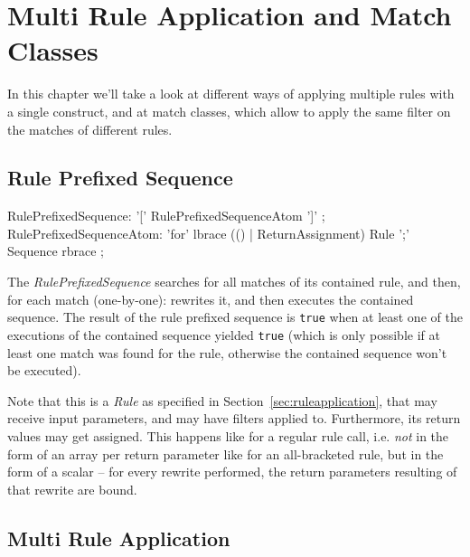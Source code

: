 \chapter{Multi Rule Application and Match Classes}
\label{cha:multiruleseq}

In this chapter we'll take a look at different ways of applying multiple rules with a single construct, and at match classes, which allow to apply the same filter on the matches of different rules.

\section{Rule Prefixed Sequence}\label{sec:ruleprefixedsequence}

\begin{rail}
  RulePrefixedSequence: '[' RulePrefixedSequenceAtom ']' ;
  RulePrefixedSequenceAtom: 'for' lbrace (() | ReturnAssignment) Rule ';' Sequence rbrace ;
\end{rail}

The \emph{RulePrefixedSequence} searches for all matches of its contained rule, and then, for each match (one-by-one): rewrites it, and then executes the contained sequence.
The result of the rule prefixed sequence is \texttt{true} when at least one of the executions of the contained sequence  yielded \texttt{true} (which is only possible if at least one match was found for the rule, otherwise the contained sequence won't be executed).

Note that this is a \emph{Rule} as specified in Section~\ref{sec:ruleapplication}, that may receive input parameters, and may have filters applied to.
Furthermore, its return values may get assigned.
This happens like for a regular rule call, i.e. \emph{not} in the form of an array per return parameter like for an all-bracketed rule, but in the form of a scalar -- for every rewrite performed, the return parameters resulting of that rewrite are bound.


\section{Multi Rule Application} \label{sec:multiruleapplication}

